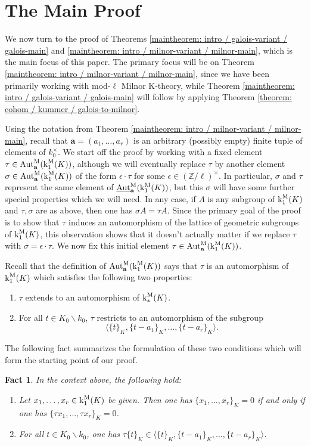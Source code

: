 \documentclass[11pt]{amsart}
\newtheorem{fact}[proposition]{Fact}
\theoremstyle{definition}
\theoremstyle{remark}
\numberwithin{equation}{section}
\DeclareMathOperator{\Aut}{Aut}
\newcommand{\Z}{\mathbb{Z}}
\newcommand{\abf}{\mathbf{a}}
\newcommand{\Autm}{\Aut^{\rm M}}
\newcommand{\UAutm}{\underline{\Aut}^{\rm M}}
\renewcommand{\k}{\operatorname{k}^{\rm M}}
\begin{document}
\section{The Main Proof}
\label{section: mainproof}


We now turn to the proof of Theorems \ref{maintheorem: intro / galois-variant / galois-main} and \ref{maintheorem: intro / milnor-variant / milnor-main}, which is the main focus of this paper.
The primary focus will be on Theorem \ref{maintheorem: intro / milnor-variant / milnor-main}, since we have been primarily working with mod-$\ell$ Milnor K-theory, while Theorem \ref{maintheorem: intro / galois-variant / galois-main} will follow by applying Theorem \ref{theorem: cohom / kummer / galois-to-milnor}.

Using the notation from Theorem \ref{maintheorem: intro / milnor-variant / milnor-main}, recall that $\abf = (a_1,\ldots,a_r)$ is an arbitrary (possibly empty) finite tuple of elements of $k_0^\times$.
We start off the proof by working with a fixed element $\tau \in \Autm_\abf(\k_1(K))$, although we will eventually replace $\tau$ by another element $\sigma \in \Autm_\abf(\k_1(K))$ of the form $\epsilon \cdot \tau$ for some $\epsilon \in (\Z/\ell)^\times$.
In particular, $\sigma$ and $\tau$ represent the same element of $\UAutm_\abf(\k_1(K))$, but this $\sigma$ will have some further special properties which we will need.
In any case, if $A$ is any subgroup of $\k_1(K)$ and $\tau,\sigma$ are as above, then one has $\sigma A = \tau A$.
Since the primary goal of the proof is to show that $\tau$ induces an automorphism of the lattice of geometric subgroups of $\k_1(K)$, this observation shows that it doesn't actually matter if we replace $\tau$ with $\sigma = \epsilon \cdot \tau$.
We now fix this initial element $\tau \in \Autm_\abf(\k_1(K))$.

Recall that the definition of $\Autm_\abf(\k_1(K))$ says that $\tau$ is an automorphism of $\k_1(K)$ which satisfies the following two properties:
\begin{enumerate}
  \item $\tau$ extends to an automorphism of $\k_*(K)$.
  \item For all $t \in K_0 \smallsetminus k_0$, $\tau$ restricts to an automorphism of the subgroup
  \[ \langle \{t\}_K,\{t-a_1\}_K,\ldots,\{t-a_r\}_K \rangle. \]
\end{enumerate}
The following fact summarizes the formulation of these two conditions which will form the starting point of our proof.
\begin{fact}
\label{fact: mainproof / autm-condition}
  In the context above, the following hold:
  \begin{enumerate}
    \item Let $x_1,\ldots,x_r \in \k_1(K)$ be given.
    Then one has $\{x_1,\ldots,x_r\}_K = 0$ if and only if one has $\{\tau x_1,\ldots,\tau x_r\}_K = 0$.
    \item For all $t \in K_0 \smallsetminus k_0$, one has $\tau \{t\}_K \in \langle \{t\}_K,\{t-a_1\}_K,\ldots,\{t-a_r\}_K \rangle$.
  \end{enumerate}
\end{fact}
\end{document}
